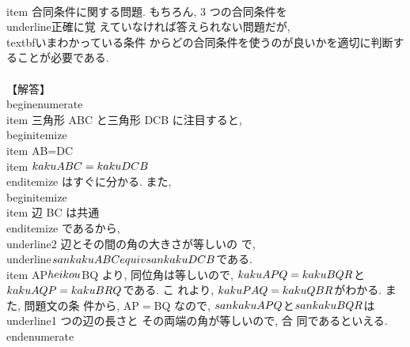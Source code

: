  \\item 合同条件に関する問題. もちろん, 3 つの合同条件を\\underline{正確に}覚
       えていなければ答えられない問題だが, \\textbf{いまわかっている条件
       からどの合同条件を使うのが良いかを適切に判断することが必要}である.
       \\\\
       【解答】
       \\begin{enumerate}
	\\item 三角形 ABC と三角形 DCB に注目すると,
	      \\begin{itemize}
	       \\item AB=DC
	       \\item $\\kaku{ABC}=\\kaku{DCB}$
	      \\end{itemize}
	      はすぐに分かる. また,
	      \\begin{itemize}
	       \\item 辺 BC は共通
	      \\end{itemize}
	      であるから, \\underline{2 辺とその間の角の大きさが等しい}の
	      で, \\underline{$\\sankaku{ABC}\\equiv\\sankaku{DCB}$}である.
	\\item AP$\\heikou$BQ より, 同位角は等しいので,
	      $\\kaku{APQ}=\\kaku{BQR}$と$\\kaku{AQP}=\\kaku{BRQ}$である. こ
	      れより, $\\kaku{PAQ}=\\kaku{QBR}$がわかる. また, 問題文の条
	      件から, AP$=$BQ なので, $\\sankaku{APQ}$と$\\sankaku{BQR}$は
	      \\underline{1 つの辺の長さと その両端の角が等しい}ので, 合
	      同であるといえる.
       \\end{enumerate}

